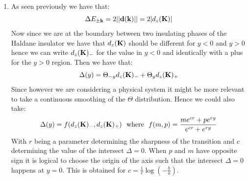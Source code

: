 \documentclass[10pt,a4paper]{article}
\begin{document}
\begin{enumerate}
\item 
As seen previously we have that:
\[
\Delta E_{\pm \vb{k}} = 2 || \vb{d}(\vb{k})|| = 2 | d_z(\vb{K}) |
\]
Now since we are at the boundary between two insulating phases of the Haldane insulator we have that $d_z(\vb{K})$ should be different for $y < 0$ and $y > 0$ hence we can write $d_z(\vb{K})_-$ for the value in $y < 0$ and identically with a plus for the $y > 0$ region. Then we have that:
\[
\Delta(y) = \Theta_{-y} d_z(\vb{K})_-  + \Theta_{y} d_z(\vb{K})_+ 
\]
Since however we are considering a physical system it might be more relevant to take a continuous smoothing of the $\Theta$ distribution. Hence we could also take:
\[
\Delta(y) = f(d_z(\vb{K})_-, d_z(\vb{K})_+) \mbox{~~where~~} f(m, p) = \frac{m e^{cr} + p e^{ry}}{e^{cr} + e^{ry}}
\]
With $r$ being a parameter determining the sharpness of the transition and $c$ determining the value of the intersect $\Delta = 0$. When $p$ and $m$ have opposite sign it is logical to choose the origin of the axis such that the intersect $\Delta = 0$ happens at $y = 0$. This is obtained for $c = \frac{1}{r}\log(-\frac{b}{a})$. 


\end{enumerate}
\end{document}
